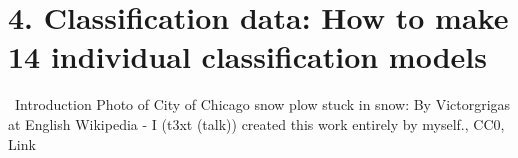 \documentclass[
]{book}
\begin{document}
\chapter{4. Classification data: How to make 14 individual classification models}\label{classification-data-how-to-make-14-individual-classification-models}

~Introduction
Photo of City of Chicago snow plow stuck in snow: By Victorgrigas at English Wikipedia - I (t3xt (talk)) created this work entirely by myself., CC0, Link

  
\end{document}

